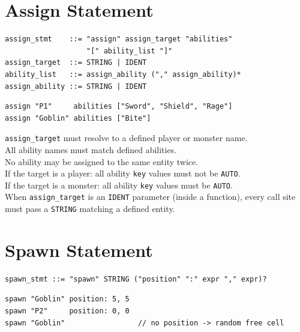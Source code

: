 \documentclass[12pt,a4paper]{article}
\begin{document}
\section{Assign Statement}

\begin{lstlisting}[style=bnf]
assign_stmt    ::= "assign" assign_target "abilities"
                   "[" ability_list "]"
assign_target  ::= STRING | IDENT
ability_list   ::= assign_ability ("," assign_ability)*
assign_ability ::= STRING | IDENT
\end{lstlisting}

\begin{lstlisting}[style=dsl]
assign "P1"     abilities ["Sword", "Shield", "Rage"]
assign "Goblin" abilities ["Bite"]
\end{lstlisting}

\begin{cbox}
\texttt{assign\_target} must resolve to a defined player or monster name.\\
All ability names must match defined abilities.\\
No ability may be assigned to the same entity twice.\\
If the target is a player: all ability \texttt{key} values must not be \texttt{AUTO}.\\
If the target is a monster: all ability \texttt{key} values must be \texttt{AUTO}.\\
When \texttt{assign\_target} is an \texttt{IDENT} parameter (inside a function),
every call site must pass a \texttt{STRING} matching a defined entity.
\end{cbox}

\section{Spawn Statement}

\begin{lstlisting}[style=bnf]
spawn_stmt ::= "spawn" STRING ("position" ":" expr "," expr)?
\end{lstlisting}

\begin{lstlisting}[style=dsl]
spawn "Goblin" position: 5, 5
spawn "P2"     position: 0, 0
spawn "Goblin"                 // no position -> random free cell
\end{lstlisting}
\end{document}
